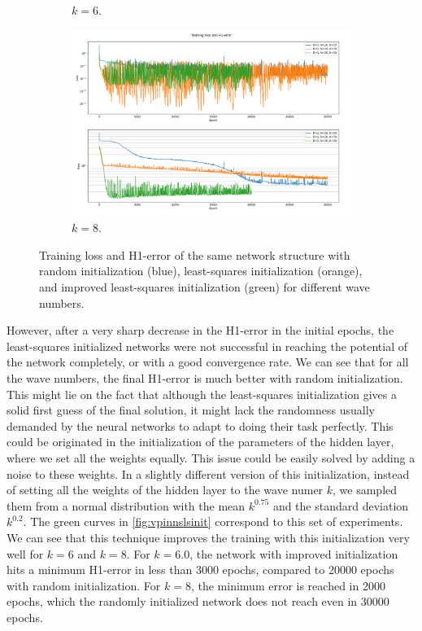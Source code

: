 \begin{figure}[h!]
\begin{subfigure}[b]{0.48\textwidth}
        \caption{$k=6$.}
        \label{fig:vpinnslsinitk6}
    \end{subfigure}
    \hfill
    \begin{subfigure}[b]{0.48\textwidth}
        \includegraphics[width=\textwidth]{img/VPINN-Comparison-lsinitk8.png}
        \caption{$k=8$.}
        \label{fig:vpinnslsinitk8}
    \end{subfigure}
    \caption{Training loss and H1-error of the same network structure with random initialization (blue), least-squares initialization (orange), and improved least-squares initialization (green) for different wave numbers.}
    \label{fig:vpinnslsinit}
\end{figure}

However, after a very sharp decrease in the H1-error in the initial epochs, the least-squares initialized networks were not successful in reaching the potential of the network completely, or with a good convergence rate. We can see that for all the wave numbers, the final H1-error is much better with random initialization. This might lie on the fact that although the least-squares initialization gives a solid first guess of the final solution, it might lack the randomness usually demanded by the neural networks to adapt to doing their task perfectly. This could be originated in the initialization of the parameters of the hidden layer, where we set all the weights equally. This issue could be easily solved by adding a noise to these weights. In a slightly different version of this initialization, instead of setting all the weights of the hidden layer to the wave numer $k$, we sampled them from a normal distribution with the mean $k^{0.75}$ and the standard deviation $k^{0.2}$. The green curves in \autoref{fig:vpinnslsinit} correspond to this set of experiments. We can see that this technique improves the training with this initialization very well for $k=6$ and $k=8$. For $k=6.0$, the network with improved initialization hits a minimum H1-error in less than 3000 epochs, compared to 20000 epochs with random initialization. For $k=8$, the minimum error is reached in 2000 epochs, which the randomly initialized network does not reach even in 30000 epochs.

